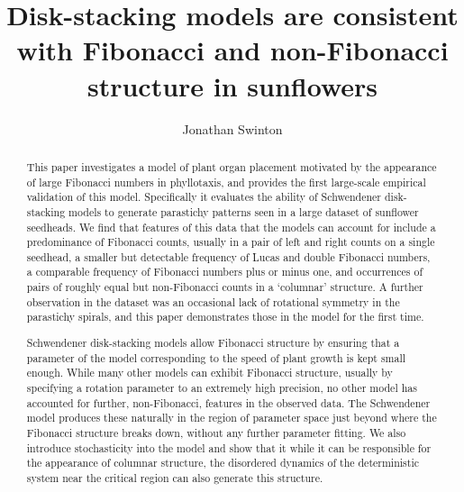\documentclass[a4paper,10pt]{amsart}
\begin{document}
\title[Disk-stacking models]{Disk-stacking models are consistent with Fibonacci and non-Fibonacci structure in sunflowers} 
\author{Jonathan Swinton}
\address{ORCID 0000-0002-3196-9653}



\begin{abstract}
This paper investigates a model of plant organ placement motivated by the appearance of large Fibonacci numbers in phyllotaxis, and provides the first large-scale empirical validation of this model. Specifically it evaluates the ability of Schwendener disk-stacking models to generate parastichy patterns seen in a large dataset of sunflower seedheads. We find that features of this data that the models can account for include a predominance of Fibonacci counts, usually in a pair of left and right counts on a single seedhead, a smaller but detectable frequency of Lucas and double Fibonacci numbers, a comparable frequency of Fibonacci numbers plus or minus one, and occurrences of pairs of roughly equal but non-Fibonacci counts in a `columnar' structure. A further observation in the dataset was an occasional lack of rotational symmetry in the parastichy spirals, and this paper demonstrates those in the model for the first time.

 Schwendener disk-stacking models allow Fibonacci structure by ensuring that a parameter of the model corresponding to the speed of plant growth is kept small enough. While many other models can exhibit Fibonacci structure, usually by specifying a rotation parameter to an extremely high precision, no other model has accounted for further, non-Fibonacci, features in the observed data.  The Schwendener model produces these naturally in the region of parameter space just beyond where the Fibonacci structure breaks down, without any further parameter fitting. We also introduce stochasticity into the model and show that it while it can be responsible for the appearance of columnar structure, the disordered dynamics of the deterministic system near the critical region can also generate this structure. 

\end{abstract}
\maketitle 

\end{document}
